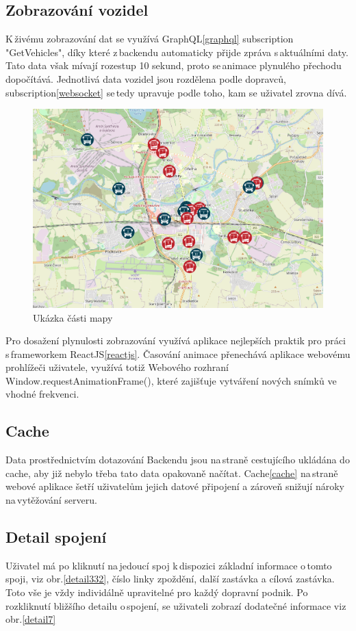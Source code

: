 \subsection{Zobrazování vozidel}
K\,živému zobrazování dat se využívá GraphQL\ref{graphql} subscription "GetVehicles", díky které z\,backendu automaticky přijde zpráva s\,aktuálními daty. Tato data však mívají rozestup 10 sekund, proto se\,animace plynulého přechodu dopočítává. Jednotlivá data vozidel jsou rozdělena podle dopravců, subscription\ref{websocket} se\,tedy upravuje podle toho, kam se uživatel zrovna dívá.
\begin{figure}[H]
    \centering
    \includegraphics[width=1\textwidth]{images/Screenshot from 2023-03-18 20-15-00.png}
    \caption{Ukázka části mapy}
    \label{mapa}
\end{figure}

Pro dosažení plynulosti zobrazování využívá aplikace nejlepších praktik pro práci s\,frameworkem ReactJS\ref{reactjs}. Časování animace přenechává aplikace webovému prohlížeči uživatele, využívá totiž Webového rozhraní Window.requestAnimationFrame()\cite{animationframe}, které zajišťuje vytváření nových snímků ve\,vhodné frekvenci.
\subsection{Cache}
Data prostřednictvím dotazování Backendu jsou na\,straně cestujícího ukládána do cache, aby již nebylo třeba tato data opakovaně načítat.
Cache\ref{cache} na\,straně webové aplikace šetří uživatelům jejich datové připojení a zároveň snižují nároky na\,vytěžování serveru.

\subsection{Detail spojení}
Uživatel má po kliknutí na\,jedoucí spoj k\,dispozici základní informace o\,tomto spoji, viz obr.\ref{detail332}, číslo linky zpoždění, další zastávka a cílová zastávka. Toto vše je vždy individálně upravitelné pro každý dopravní podnik. Po rozkliknutí bližšího detailu o\,spojení, se uživateli zobrazí dodatečné informace viz obr.\ref{detail7}

